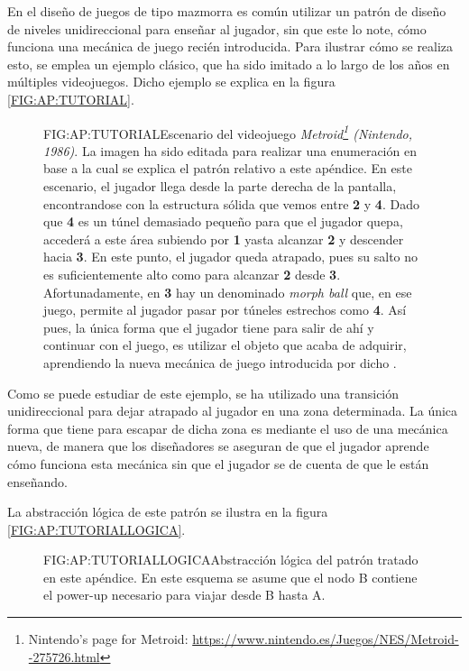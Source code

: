En el diseño de juegos de tipo mazmorra es común utilizar un patrón de diseño de niveles unidireccional para enseñar al jugador, sin que este lo note, cómo funciona una mecánica de juego recién introducida.
Para ilustrar cómo se realiza esto, se emplea un ejemplo clásico, que ha sido imitado a lo largo de los años en múltiples videojuegos. Dicho ejemplo se explica en la figura \ref{FIG:AP:TUTORIAL}.

\begin{figure}{FIG:AP:TUTORIAL}{Escenario del videojuego \textit{Metroid\footnote{Nintendo's page for Metroid: \url{https://www.nintendo.es/Juegos/NES/Metroid--275726.html}} (Nintendo, 1986)}. La imagen ha sido editada para realizar una enumeración en base a la cual se explica el patrón relativo a este apéndice. En este escenario, el jugador llega desde la parte derecha de la pantalla, encontrandose con la estructura sólida que vemos entre \textbf{2} y \textbf{4}. Dado que \textbf{4} es un túnel demasiado pequeño para que el jugador quepa, accederá a este área subiendo por \textbf{1} yasta alcanzar \textbf{2} y descender hacia \textbf{3}. En este punto, el jugador queda atrapado, pues su salto no es suficientemente alto como para alcanzar \textbf{2} desde \textbf{3}. Afortunadamente, en \textbf{3} hay un  denominado \textit{morph ball} que, en ese juego, permite al jugador pasar por túneles estrechos como \textbf{4}. Así pues, la única forma que el jugador tiene para salir de ahí y continuar con el juego, es utilizar el objeto que acaba de adquirir, aprendiendo la nueva mecánica de juego introducida por dicho .}
\end{figure}

Como se puede estudiar de este ejemplo, se ha utilizado una transición unidireccional para dejar atrapado al jugador en una zona determinada. La única forma que tiene para escapar de dicha zona es mediante el uso de una mecánica nueva, de manera que los diseñadores se aseguran de que el jugador aprende cómo funciona esta mecánica sin que el jugador se de cuenta de que le están enseñando.

La abstracción lógica de este patrón se ilustra en la figura \ref{FIG:AP:TUTORIALLOGICA}.

\begin{figure}{FIG:AP:TUTORIALLOGICA}{Abstracción lógica del patrón tratado en este apéndice. En este esquema se asume que el nodo B contiene el power-up necesario para viajar desde B hasta A.}
\end{figure}